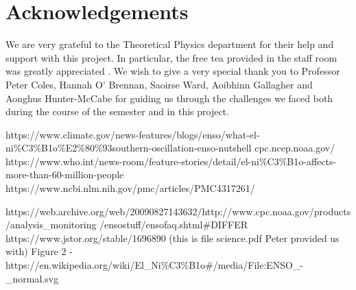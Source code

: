 \documentclass{article}
\begin{document}
\section{Acknowledgements}

We are very grateful to the Theoretical Physics department for their help and support with this project. In particular, the free tea provided in the staff room was greatly appreciated . We wish to give a very special thank you to Professor Peter Coles, Hannah O’ Brennan, Saoirse Ward, Aoibhinn Gallagher and Aonghus Hunter-McCabe for guiding us through the challenges we faced both during the course of the semester and in this project.

\begin{thebibliography}{9}

\bibitem{}
    https://www.climate.gov/news-features/blogs/enso/what-el-ni\%C3\%B1o\%E2\%80\%93southern-oscillation-enso-nutshell
\bibitem{}
    cpc.ncep.noaa.gov/
\bibitem{}
    https://www.who.int/news-room/feature-stories/detail/el-ni\%C3\%B1o-affects-more-than-60-million-people
\bibitem{}  
https://www.ncbi.nlm.nih.gov/pmc/articles/PMC4317261/

\bibitem{}
https://web.archive.org/web/20090827143632/http://www.cpc.noaa.gov/products/analysis\_monitoring
/ensostuff/ensofaq.shtml#DIFFER
\bibitem{}
https://www.jstor.org/stable/1696890 (this is file science.pdf Peter provided us with)
\bibitem{}
Figure 2 - https://en.wikipedia.org/wiki/El\_Ni\%C3\%B1o#/media/File:ENSO\_-\_normal.svg

\end{thebibliography}
\end{document}

